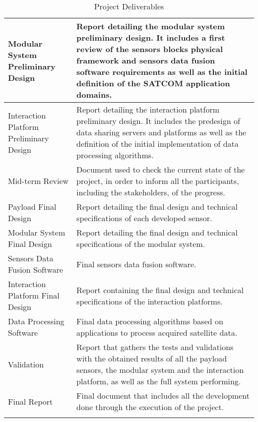 \begin{longtable}[H]{p{4cm}p{10cm}}
	Modular System Preliminary Design  & 
	Report detailing the modular system preliminary design. It includes a first review of the sensors blocks physical framework and sensors data fusion software requirements as well as the initial definition of the SATCOM application domains. 
	\vspace{0.2cm}
	\\ \midrule

	Interaction Platform Preliminary Design  & 
	Report detailing the interaction platform preliminary design. It includes the predesign of data sharing servers and platforms as well as the definition of the initial implementation of data processing algorithms.  
	\vspace{0.2cm}
	\\ \midrule
	
	Mid-term Review & 
	Document used to check the current state of the project, in order to inform all the participants, including the stakeholders, of the progress. 
	\vspace{0.2cm}
	\\ \midrule
	
	Payload Final Design  & 
	Report detailing the final design and technical specifications of each developed sensor. 
	\vspace{0.2cm}
	\\ \midrule

	Modular System  Final Design  & 
	Report detailing the final design and technical specifications of the modular system. 
	\vspace{0.2cm}
	\\ \midrule

	Sensors Data Fusion Software  & 
	Final sensors data fusion software.
	\vspace{0.2cm}
	\\ \midrule

	Interaction Platform Final Design  & 
	Report containing the final design and technical specifications of the interaction platforms. 
	\vspace{0.2cm}
	\\ \midrule

	Data Processing Software  & 
	Final data processing algorithms based on applications to process acquired satellite data. 
	\vspace{0.2cm}
	\\ \midrule

	Validation & 
	Report that gathers the tests and validations with the obtained results of all the payload sensors, the modular system and the interaction platform, as well as the full system performing. 
	\vspace{0.2cm}
	\\ \midrule
		
	Final Report & 
	Final document that includes all the development done through the execution of the project. 
	\vspace{0.2cm}

	\\ \bottomrule[2pt]
	
	\caption{Project Deliverables}
	\label{PDel}

\end{longtable}